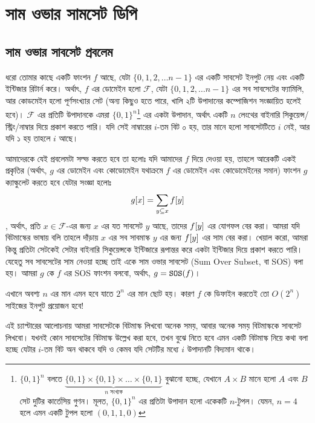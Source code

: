 \chapter{সাম ওভার সামসেট ডিপি}

\section{সাম ওভার সাবসেট প্রবলেম}

ধরো তোমার কাছে একটি ফাংশন $f$ আছে, যেটা $\{0, 1, 2, \ldots n-1\}$ এর একটি
সাবসেট ইনপুট নেয় এবং একটি ইন্টিজার রিটার্ন করে। অর্থাৎ, $f$ এর ডোমেইন হলো
$\mathcal{F}$, যেটা $\{0, 1, 2, \ldots n-1\}$ এর সব সাবসেটের ফ্যামিলি, আর
কোডমেইন হলো পূর্ণসংখ্যার সেট (অন্য কিছুও হতে পারে, খালি ২টি উপাদানের
কম্পোজিশন সংজ্ঞায়িত হলেই হবে)। $\mathcal{F}$ এর প্রতিটি উপাদানকে এমরা $\{0,
1\}^n$\footnote{$\{0,1\}^n$ বলতে $\underbrace{\{0,1\} \times \{0,1\} \times
\dots \times \{0,1\}}_{\text{$n$ সংখ্যক}}$ বুঝানো হচ্ছে, যেখানে $A \times B$
মানে হলো $A$ এবং $B$ সেট দুটির কার্তেসিয় গুণন। মূলত, $\{0,1\}^n$ এর প্রতিটা
উপাদান হলো একেকটি $n$-টুপল। যেমন, $n=4$ হলে এমন একটি টুপল হলো $\left(0, 1,
1, 0 \right)$} এর একটা উপাদান, অর্থাৎ একটি $n$ লেংথের বাইনারি
সিকুয়েন্স/স্ট্রিং/নাম্বার দিয়ে প্রকাশ করতে পারি। যদি সেই নাম্বারের $i$-তম বিট
০ হয়, তার মানে হলো সাবসেটটিতে $i$ নেই, আর যদি ১ হয় তাহলে $i$ আছে।

আমাদেরকে যেই প্রবলেমটা সল্ভ করতে হবে তা হলোঃ যদি আমাদের $f$ দিয়ে দেওয়া হয়,
তাহলে আরেকটি একই প্রকৃতির (অর্থাৎ, $g$ এর ডোমেইন এবং কোডোমেইন যথাক্রমে $f$
এর ডোমেইন এবং কোডোমেইনের সমান) ফাংশন $g$ ক্যাল্কুলেট করতে হবে যেটার সংজ্ঞা
হলোঃ
\[
  g[x] = \sum_{y \subseteq x} f[y]
\], অর্থাৎ, প্রতি $x \in \mathcal{F}$-এর জন্য $x$ এর যত সাবসেট $y$ আছে, তাদের
$f[y]$ এর যোগফল বের করা। আমরা যদি বিটমাস্কের ভাষায় বলি তাহলে দাঁড়ায় $x$
এর সব সাবমাস্ক $y$ এর জন্য $f[y]$ এর সাম বের করা। খেয়াল করো, আমরা কিন্তু
প্রতিটা সেটকেই সেটার বাইনারি সিকুয়েন্সকে ইন্টিজারে রূপান্তর করে একটা ইন্টিজার
দিয়ে প্রকাশ করতে পারি। যেহেতু সব সাবসেটের সাম নেওয়া হচ্ছে তাই একে সাম ওভার
সাবসেট (Sum Over Subset, বা SOS) বলা হয়। আমরা $g$ কে $f$ এর SOS ফাংশন বলবো,
অর্থাৎ, $g = \texttt{SOS}(f)$।

এখানে অবশ্য $n$ এর মান এমন হবে যাতে $2^n$ এর মান ছোট হয়। কারণ $f$ কে ডিফাইন
করতেই তো $O(2^n)$ সাইজের ইনপুট প্রয়োজন হবে!

এই চ্যাপ্টারের আলোচনায় আমরা সাবসেটকে বিটমাস্ক লিখবো অনেক সময়, আবার অনেক সময়
বিটমাস্ককে সাবসেট লিখবো। যখনই কোন সাবসেটের বিটমাস্ক উল্লেখ করা হবে, তখন বুঝে
নিতে হবে এমন একটি বিটমাস্ক নিয়ে কথা বলা হচ্ছে যেটার $i$-তম বিট অন থাকবে যদি ও
কেমব যদি সেটটির মধ্যে $i$ উপাদানটি বিদ্যমান থাকে।


